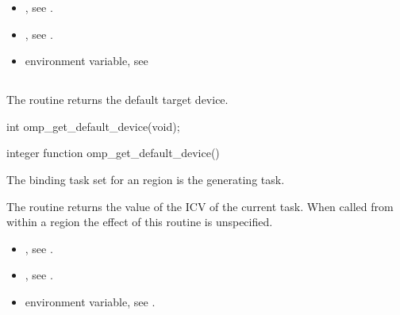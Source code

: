 \crossreferences
\begin{itemize}
\item {}, see 
.

\item {}, see 
.

\item {} environment variable, see 
\end{itemize}










\subsection{}
\label{subsec:omp_get_default_device}
\summary
The  routine returns the default target device.

\format
\ccppspecificstart
\begin{boxedcode}
int omp\_get\_default\_device(void);
\end{boxedcode}
\ccppspecificend

\fortranspecificstart
\begin{boxedcode}
integer function omp\_get\_default\_device()
\end{boxedcode}
\fortranspecificend

\binding
The binding task set for an  region is the generating 
task. 

\effect
The  routine returns the value of the  
ICV of the current task. When called from within a  region the effect of this 
routine is unspecified.

\crossreferences
\begin{itemize}
\item {}, see 
.

\item {}, see 
.

\item {} environment variable, see 
. 
\end{itemize}











